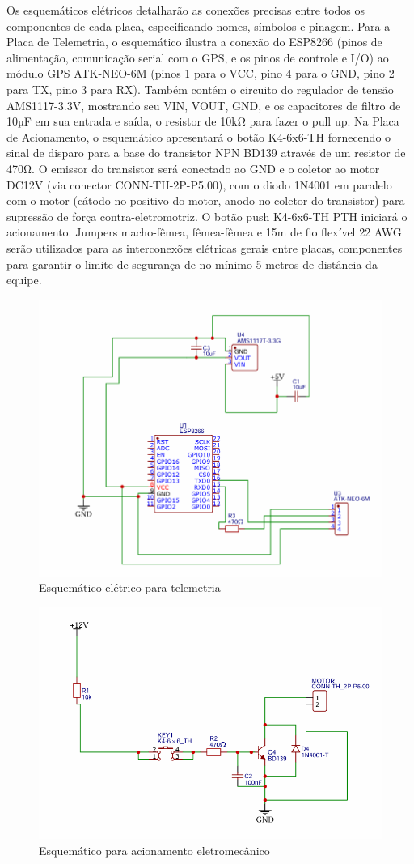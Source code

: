  Os esquemáticos elétricos detalharão as conexões precisas entre todos os componentes de cada placa, especificando nomes, símbolos e pinagem. Para a Placa de Telemetria, o esquemático ilustra a conexão do ESP8266 (pinos de alimentação, comunicação serial com o GPS, e os pinos de controle e I/O) ao módulo GPS ATK-NEO-6M (pinos 1 para o VCC, pino 4 para o GND, pino 2 para TX, pino 3 para RX). Também contém o circuito do regulador de tensão AMS1117-3.3V, mostrando seu VIN, VOUT, GND, e os capacitores de filtro de 10µF em sua entrada e saída, o resistor de 10kΩ para fazer o pull up. Na Placa de Acionamento, o esquemático apresentará o botão K4-6x6-TH fornecendo o sinal de disparo para a base do transistor NPN BD139 através de um resistor de 470Ω. O emissor do transistor será conectado ao GND e o coletor ao motor DC12V (via conector CONN-TH-2P-P5.00), com o diodo 1N4001 em paralelo com o motor (cátodo no positivo do motor, anodo no coletor do transistor) para supressão de força contra-eletromotriz. O botão push K4-6x6-TH PTH iniciará o acionamento. Jumpers macho-fêmea, fêmea-fêmea e 15m de fio flexível 22 AWG serão utilizados para as interconexões elétricas gerais entre placas, componentes para  garantir o limite de segurança de no mínimo 5 metros de distância da equipe.


 \begin{figure}[H]
    \centering
    \includegraphics[width=0.5\linewidth]{figuras/esp.png}
    \caption{Esquemático elétrico para telemetria}
    \label{fig:diagrama de blocos}
\end{figure}


\begin{figure}[H]
    \centering
    \includegraphics[width=0.5\linewidth]{figuras/motor.png}
    \caption{Esquemático para acionamento eletromecânico}
    \label{fig:diagrama de blocos}
\end{figure}

